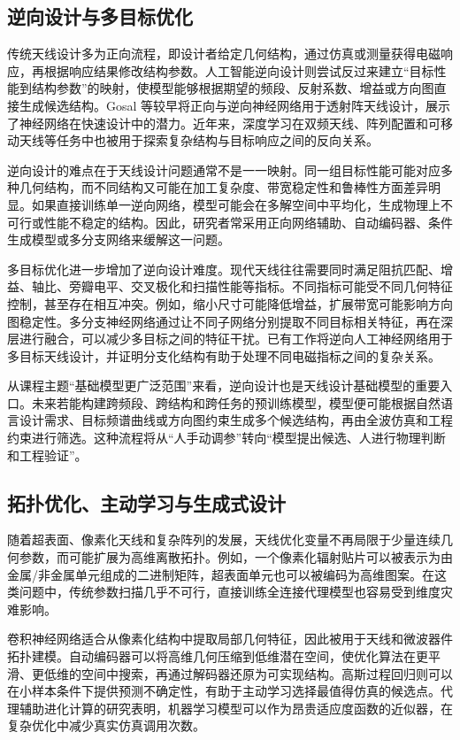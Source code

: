 \documentclass[UTF8,a4paper,12pt]{ctexart}
\begin{document}
\subsection{逆向设计与多目标优化}

传统天线设计多为正向流程，即设计者给定几何结构，通过仿真或测量获得电磁响应，再根据响应结果修改结构参数。人工智能逆向设计则尝试反过来建立“目标性能到结构参数”的映射，使模型能够根据期望的频段、反射系数、增益或方向图直接生成候选结构。Gosal 等较早将正向与逆向神经网络用于透射阵天线设计，展示了神经网络在快速设计中的潜力\cite{gosal2016transmitarray}。近年来，深度学习在双频天线、阵列配置和可移动天线等任务中也被用于探索复杂结构与目标响应之间的反向关系\cite{gadhafi2024dualband,lin2025array,shao2025movable}。

逆向设计的难点在于天线设计问题通常不是一一映射。同一组目标性能可能对应多种几何结构，而不同结构又可能在加工复杂度、带宽稳定性和鲁棒性方面差异明显。如果直接训练单一逆向网络，模型可能会在多解空间中平均化，生成物理上不可行或性能不稳定的结构。因此，研究者常采用正向网络辅助、自动编码器、条件生成模型或多分支网络来缓解这一问题。

多目标优化进一步增加了逆向设计难度。现代天线往往需要同时满足阻抗匹配、增益、轴比、旁瓣电平、交叉极化和扫描性能等指标。不同指标可能受不同几何特征控制，甚至存在相互冲突。例如，缩小尺寸可能降低增益，扩展带宽可能影响方向图稳定性。多分支神经网络通过让不同子网络分别提取不同目标相关特征，再在深层进行融合，可以减少多目标之间的特征干扰。已有工作将逆向人工神经网络用于多目标天线设计，并证明分支化结构有助于处理不同电磁指标之间的复杂关系\cite{xiao2021inverse,liu2022lens}。

从课程主题“基础模型更广泛范围”来看，逆向设计也是天线设计基础模型的重要入口。未来若能构建跨频段、跨结构和跨任务的预训练模型，模型便可能根据自然语言设计需求、目标频谱曲线或方向图约束生成多个候选结构，再由全波仿真和工程约束进行筛选。这种流程将从“人手动调参”转向“模型提出候选、人进行物理判断和工程验证”。

\subsection{拓扑优化、主动学习与生成式设计}

随着超表面、像素化天线和复杂阵列的发展，天线优化变量不再局限于少量连续几何参数，而可能扩展为高维离散拓扑。例如，一个像素化辐射贴片可以被表示为由金属/非金属单元组成的二进制矩阵，超表面单元也可以被编码为高维图案。在这类问题中，传统参数扫描几乎不可行，直接训练全连接代理模型也容易受到维度灾难影响。

卷积神经网络适合从像素化结构中提取局部几何特征，因此被用于天线和微波器件拓扑建模。自动编码器可以将高维几何压缩到低维潜在空间，使优化算法在更平滑、更低维的空间中搜索，再通过解码器还原为可实现结构。高斯过程回归则可以在小样本条件下提供预测不确定性，有助于主动学习选择最值得仿真的候选点。代理辅助进化计算的研究表明，机器学习模型可以作为昂贵适应度函数的近似器，在复杂优化中减少真实仿真调用次数\cite{jin2011surrogate,liu2014efficient,wu2024geometry,han2025windload,yang2025cnn}。
\end{document}
